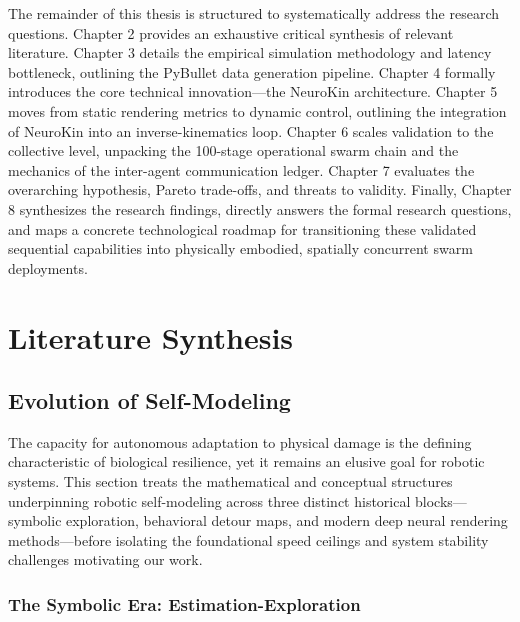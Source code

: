 \documentclass[12pt,a4paper,oneside]{report}
\begin{document}
The remainder of this thesis is structured to systematically address the research questions. Chapter 2 provides an exhaustive critical synthesis of relevant literature. Chapter 3 details the empirical simulation methodology and latency bottleneck, outlining the PyBullet data generation pipeline. Chapter 4 formally introduces the core technical innovation---the NeuroKin architecture. Chapter 5 moves from static rendering metrics to dynamic control, outlining the integration of NeuroKin into an inverse-kinematics loop. Chapter 6 scales validation to the collective level, unpacking the 100-stage operational swarm chain and the mechanics of the inter-agent communication ledger. Chapter 7 evaluates the overarching hypothesis, Pareto trade-offs, and threats to validity. Finally, Chapter 8 synthesizes the research findings, directly answers the formal research questions, and maps a concrete technological roadmap for transitioning these validated sequential capabilities into physically embodied, spatially concurrent swarm deployments.

\clearpage

\chapter{Literature Synthesis}

\section{Evolution of Self-Modeling}



The capacity for autonomous adaptation to physical damage is the defining characteristic of biological resilience, yet it remains an elusive goal for robotic systems. This section treats the mathematical and conceptual structures underpinning robotic self-modeling across three distinct historical blocks---symbolic exploration, behavioral detour maps, and modern deep neural rendering methods---before isolating the foundational speed ceilings and system stability challenges motivating our work.

\subsection{The Symbolic Era: Estimation-Exploration}
\end{document}
